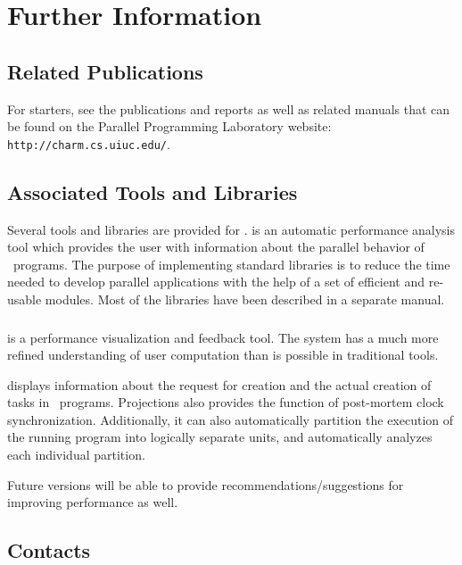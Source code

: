 \section{Further Information}

\subsection{Related Publications}
\label{publications}

For starters, see the publications and reports as well
as related manuals that can be found on the Parallel Programming
Laboratory website: \texttt{http://charm.cs.uiuc.edu/}. 

\subsection{Associated Tools and Libraries}

Several tools and libraries are provided for \charmpp{}. \projections{} 
is an automatic performance analysis tool which provides
the user with information about the parallel behavior of \charmpp\ programs. 
The purpose of implementing \charmpp{} standard
libraries is to reduce the time needed to develop parallel
applications with the help of a set of efficient and re-usable modules.
Most of the libraries have been described in a separate manual.

\subsubsection{\projections}

\projections{} is a performance visualization and feedback tool. The system has
a much more refined understanding of user computation than is possible in
traditional tools.

\projections{} displays information about the request for creation and the
actual creation of tasks in \charmpp\ programs. Projections also provides the
function of post-mortem clock synchronization. Additionally, it can also
automatically partition the execution of the running program into logically
separate units, and automatically analyzes each individual partition. 

Future versions will be able to provide recommendations/suggestions for
improving performance as well.

\subsection{Contacts}
\label{Distribution}

